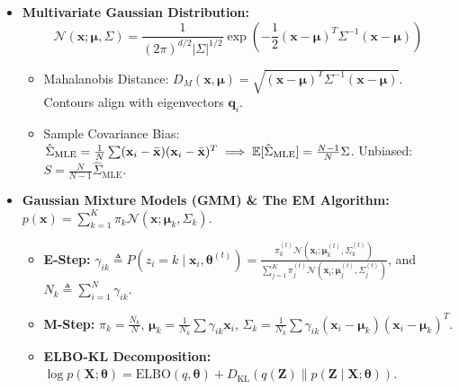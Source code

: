 \begin{tcolorbox}[breakable, colback=coralbg!30, colframe=coralborder, title={\large \textbf{7. GMMs, Expectation-Maximization \& Concentration Inequalities (Week 12)}}]
\begin{itemize}[leftmargin=*, noitemsep, topsep=2pt]
    \item \textbf{Multivariate Gaussian Distribution:}
    \begin{equation*}
    \mathcal{N}(\mathbf{x}; \boldsymbol{\mu}, \Sigma) = \frac{1}{(2\pi)^{d/2} |\Sigma|^{1/2}} \exp\left( -\frac{1}{2}(\mathbf{x} - \boldsymbol{\mu})^T \Sigma^{-1} (\mathbf{x} - \boldsymbol{\mu}) \right)
    \end{equation*}
    \begin{itemize}[leftmargin=*, noitemsep]
        \item Mahalanobis Distance: $D_M(\mathbf{x}, \boldsymbol{\mu}) = \sqrt{(\mathbf{x} - \boldsymbol{\mu})^T \Sigma^{-1} (\mathbf{x} - \boldsymbol{\mu})}$. Contours align with eigenvectors $\mathbf{q}_i$.
        \item Sample Covariance Bias: $\hat{\Sigma}_{\text{MLE}} = \frac{1}{N}\sum (\mathbf{x}_i - \bar{\mathbf{x}})(\mathbf{x}_i - \bar{\mathbf{x}})^T \implies \operatorname{\mathbb{E}}[\hat{\Sigma}_{\text{MLE}}] = \frac{N-1}{N}\Sigma$. Unbiased: $S = \frac{N}{N-1}\hat{\Sigma}_{\text{MLE}}$.
    \end{itemize}
    \item \textbf{Gaussian Mixture Models (GMM) \& The EM Algorithm:}
    $p(\mathbf{x}) = \sum_{k=1}^K \pi_k \mathcal{N}(\mathbf{x}; \boldsymbol{\mu}_k, \Sigma_k)$.
    \begin{itemize}[leftmargin=*, noitemsep]
        \item \textbf{E-Step:} $\gamma_{ik} \triangleq P(z_i = k \mid \mathbf{x}_i, \boldsymbol{\theta}^{(t)}) = \frac{\pi_k^{(t)} \mathcal{N}(\mathbf{x}_i; \boldsymbol{\mu}_k^{(t)}, \Sigma_k^{(t)})}{\sum_{j=1}^K \pi_j^{(t)} \mathcal{N}(\mathbf{x}_i; \boldsymbol{\mu}_j^{(t)}, \Sigma_j^{(t)})}$, and $N_k \triangleq \sum_{i=1}^N \gamma_{ik}$.
        \item \textbf{M-Step:} $\pi_k = \frac{N_k}{N}$, $\boldsymbol{\mu}_k = \frac{1}{N_k}\sum \gamma_{ik}\mathbf{x}_i$, $\Sigma_k = \frac{1}{N_k}\sum \gamma_{ik}(\mathbf{x}_i - \boldsymbol{\mu}_k)(\mathbf{x}_i - \boldsymbol{\mu}_k)^T$.
        \item \textbf{ELBO-KL Decomposition:} $\log p(\mathbf{X}; \boldsymbol{\theta}) = \text{ELBO}(q, \boldsymbol{\theta}) + D_{\text{KL}}\left( q(\mathbf{Z}) \parallel p(\mathbf{Z} \mid \mathbf{X}; \boldsymbol{\theta}) \right)$.

\end{itemize}
\end{itemize}
\end{tcolorbox}

